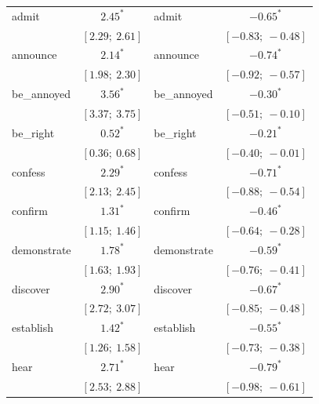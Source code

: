\documentclass[11pt,fleqn]{article}
\newcommand{\6}{\mbox{$[\hspace*{-.6mm}[$}}
\newcommand{\9}{\mbox{$]\hspace*{-.6mm}]$}}
\begin{document}
{\begin{table}
\begin{center}
\begin{tabular}{l c l c}
admit & $2.45^{*}$ &	 admit  & $-0.65^{*}$  \\
		
& $[2.29;\ 2.61]$  &	& $[-0.83;\ -0.48]$ \\
		
announce  & $2.14^{*}$ &	 announce & $-0.74^{*}$  \\
		
& $[1.98;\ 2.30]$  &	& $[-0.92;\ -0.57]$ \\
		
be\_annoyed & $3.56^{*}$ &	 be\_annoyed & $-0.30^{*}$  \\
		
& $[3.37;\ 3.75]$  &	& $[-0.51;\ -0.10]$ \\
		
be\_right & $0.52^{*}$ &	 be\_right  & $-0.21^{*}$  \\
		
& $[0.36;\ 0.68]$  &	& $[-0.40;\ -0.01]$ \\
		
confess & $2.29^{*}$ &	 confess  & $-0.71^{*}$  \\
		
& $[2.13;\ 2.45]$  &	& $[-0.88;\ -0.54]$ \\
		
confirm & $1.31^{*}$ &	 confirm  & $-0.46^{*}$  \\
		
& $[1.15;\ 1.46]$  &	& $[-0.64;\ -0.28]$ \\
		
demonstrate & $1.78^{*}$ &	 demonstrate & $-0.59^{*}$  \\
		
& $[1.63;\ 1.93]$  &	& $[-0.76;\ -0.41]$ \\
		
discover  & $2.90^{*}$ &	 discover & $-0.67^{*}$  \\
		
& $[2.72;\ 3.07]$  &	& $[-0.85;\ -0.48]$ \\
		
establish & $1.42^{*}$ &	 establish  & $-0.55^{*}$  \\
		
& $[1.26;\ 1.58]$  &	& $[-0.73;\ -0.38]$ \\
		
hear  & $2.71^{*}$ &	 hear & $-0.79^{*}$  \\
		
& $[2.53;\ 2.88]$  &	& $[-0.98;\ -0.61]$ \\
		

\end{tabular}
\end{center}
\end{table}}
\end{document}
